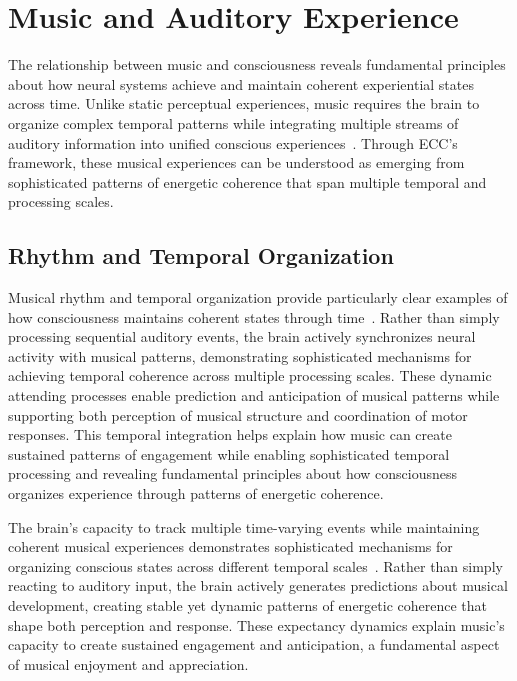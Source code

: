 \section{Music and Auditory Experience}


The relationship between music and consciousness reveals fundamental principles about how neural systems achieve and maintain coherent experiential states across time. Unlike static perceptual experiences, music requires the brain to organize complex temporal patterns while integrating multiple streams of auditory information into unified conscious experiences~\cite{Janata2002, pinotsis2023cytoelectric}. Through ECC's framework, these musical experiences can be understood as emerging from sophisticated patterns of energetic coherence that span multiple temporal and processing scales.

\subsection*{Rhythm and Temporal Organization}
Musical rhythm and temporal organization provide particularly clear examples of how consciousness maintains coherent states through time~\cite{Clayton2005, bosl2025dynamical, Large1999, amil2024theta}. Rather than simply processing sequential auditory events, the brain actively synchronizes neural activity with musical patterns, demonstrating sophisticated mechanisms for achieving temporal coherence across multiple processing scales. These dynamic attending processes enable prediction and anticipation of musical patterns while supporting both perception of musical structure and coordination of motor responses. This temporal integration helps explain how music can create sustained patterns of engagement while enabling sophisticated temporal processing and revealing fundamental principles about how consciousness organizes experience through patterns of energetic coherence.

The brain's capacity to track multiple time-varying events while maintaining coherent musical experiences demonstrates sophisticated mechanisms for organizing conscious states across different temporal scales~\cite{Huron2006, butlin2023consciousnessartificialintelligenceinsights}. Rather than simply reacting to auditory input, the brain actively generates predictions about musical development, creating stable yet dynamic patterns of energetic coherence that shape both perception and response. These expectancy dynamics explain music's capacity to create sustained engagement and anticipation, a fundamental aspect of musical enjoyment and appreciation.

